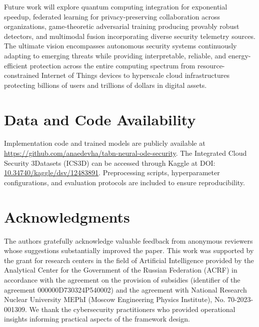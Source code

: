 \documentclass[10pt,journal,compsoc]{IEEEtran}
\begin{document}
Future work will explore quantum computing integration for exponential speedup, federated learning for privacy-preserving collaboration across organizations, game-theoretic adversarial training producing provably robust detectors, and multimodal fusion incorporating diverse security telemetry sources. The ultimate vision encompasses autonomous security systems continuously adapting to emerging threats while providing interpretable, reliable, and energy-efficient protection across the entire computing spectrum from resource-constrained Internet of Things devices to hyperscale cloud infrastructures protecting billions of users and trillions of dollars in digital assets.

\section*{Data and Code Availability}

Implementation code and trained models are publicly available at \url{https://github.com/anaedevha/tabn-neural-ode-security}. The Integrated Cloud Security 3Datasets (ICS3D) can be accessed through Kaggle at DOI: \href{https://doi.org/10.34740/kaggle/dsv/12483891}{10.34740/kaggle/dsv/12483891}. Preprocessing scripts, hyperparameter configurations, and evaluation protocols are included to ensure reproducibility.

\section*{Acknowledgments}

The authors gratefully acknowledge valuable feedback from anonymous reviewers whose suggestions substantially improved the paper. This work was supported by the grant for research centers in the field of Artificial Intelligence provided by the Analytical Center for the Government of the Russian Federation (ACRF) in accordance with the agreement on the provision of subsidies (identifier of the agreement 000000D730324P540002) and the agreement with National Research Nuclear University MEPhI (Moscow Engineering Physics Institute), No. 70-2023-001309. We thank the cybersecurity practitioners who provided operational insights informing practical aspects of the framework design.
\end{document}
